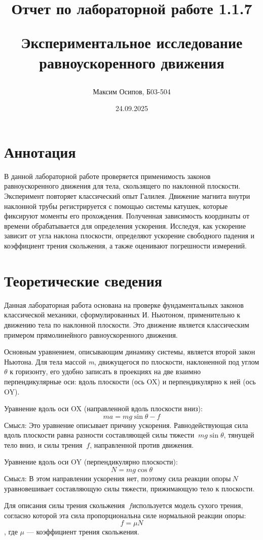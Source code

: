 \documentclass[a4paper, 12pt]{article}
\title{Отчет по лабораторной работе 1.1.7

Экспериментальное исследование  
равноускоренного движения}
\author{Максим Осипов, Б03-504}
\date{24.09.2025}
\begin{document}
\maketitle

\section{Аннотация}
В данной лабораторной работе проверяется применимость законов равноускоренного движения для тела, скользящего по наклонной плоскости. Эксперимент повторяет классический опыт Галилея. Движение магнита внутри наклонной трубы регистрируется с помощью системы катушек, которые фиксируют моменты его прохождения. Полученная зависимость координаты от времени обрабатывается для определения ускорения. Исследуя, как ускорение зависит от угла наклона плоскости, определяют ускорение свободного падения и коэффициент трения скольжения, а также оценивают погрешности измерений.

\section{Теоретические сведения}
Данная лабораторная работа основана на проверке фундаментальных законов классической механики, сформулированных И. Ньютоном, применительно к движению тела по наклонной плоскости. Это движение является классическим примером прямолинейного равноускоренного движения.

Основным уравнением, описывающим динамику системы, является второй закон Ньютона. Для тела массой 
\textit{m}, движущегося по плоскости, наклоненной под углом \(\theta\) к горизонту, его удобно записать в проекциях на две взаимно перпендикулярные оси: вдоль плоскости (ось OX) и перпендикулярно к ней (ось OY).

Уравнение вдоль оси OX (направленной вдоль плоскости вниз):
\[ m a = m g \sin \theta - f \]
Смысл: Это уравнение описывает причину ускорения. Равнодействующая сила вдоль плоскости равна разности составляющей силы тяжести \(\ m g \sin \theta\), тянущей тело вниз, и силы трения \(\ f\), направленной против движения.

Уравнение вдоль оси OY (перпендикулярно плоскости):
\[ N = m g \cos \theta \]
Смысл: В этом направлении ускорения нет, поэтому сила реакции опоры\(\ N\) уравновешивает составляющую силы тяжести, прижимающую тело к плоскости.

Для описания силы трения скольжения \(\ f\)используется модель сухого трения, согласно которой эта сила пропорциональна силе нормальной реакции опоры:
\[ f = \mu N \], где 
\(\mu\) — коэффициент трения скольжения.
\end{document}
